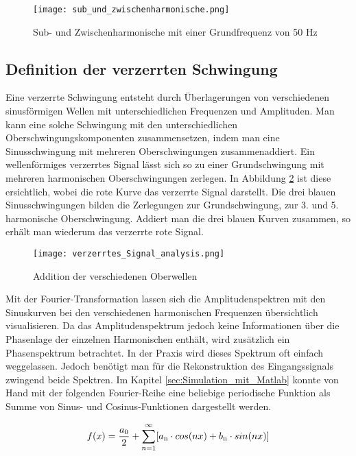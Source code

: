 \begin{figure}[ht!]
	\centering
	\texttt{[image: sub\_und\_zwischenharmonische.png]}	
	\caption{Sub- und Zwischenharmonische mit einer Grundfrequenz von 50 Hz}
	\label{fig:Sub und Zwischenharmonische}
\end{figure}



\subsection{Definition der verzerrten Schwingung}\label{sec:Verzerrte_Schwingung}
Eine verzerrte Schwingung entsteht durch Überlagerungen von verschiedenen sinusförmigen Wellen mit unterschiedlichen Frequenzen und Amplituden. Man kann eine solche Schwingung mit den unterschiedlichen Oberschwingungskomponenten zusammensetzen, indem man eine Sinusschwingung mit mehreren Oberschwingungen zusammenaddiert. Ein wellenförmiges verzerrtes Signal lässt sich so zu einer Grundschwingung mit mehreren harmonischen Oberschwingungen zerlegen. In Abbildung \ref{fig:Addition Oberwellen} ist diese ersichtlich, wobei die rote Kurve das verzerrte Signal darstellt. Die drei blauen Sinusschwingungen bilden die Zerlegungen zur Grundschwingung, zur 3. und 5. harmonische Oberschwingung. Addiert man die drei blauen Kurven zusammen, so erhält man wiederum das verzerrte rote Signal.

\begin{figure}[ht!]
	\centering
	\texttt{[image: verzerrtes\_Signal\_analysis.png]}	
	\caption{Addition der verschiedenen Oberwellen \cite{analysi3}}\label{fig:Addition Oberwellen}
\end{figure}

Mit der Fourier-Transformation lassen sich die Amplitudenspektren mit den Sinuskurven bei den verschiedenen harmonischen Frequenzen übersichtlich visualisieren. Da das Amplitudenspektrum jedoch keine Informationen über die Phasenlage der einzelnen Harmonischen enthält, wird zusätzlich ein Phasenspektrum betrachtet. In der Praxis wird dieses Spektrum oft einfach weggelassen. Jedoch benötigt man für die Rekonstruktion des Eingangssignals zwingend beide Spektren. Im Kapitel \ref{sec:Simulation_mit_Matlab} konnte von Hand mit der folgenden Fourier-Reihe eine beliebige periodische Funktion als Summe von Sinus- und Cosinus-Funktionen dargestellt werden.

\begin{equation}
f(x) = {\frac{a\textsubscript{0}}{2}}+\sum_{n=1}^\infty[a\textsubscript{n} \cdot cos(nx)+b\textsubscript{n} \cdot sin(nx)]
\end{equation}


